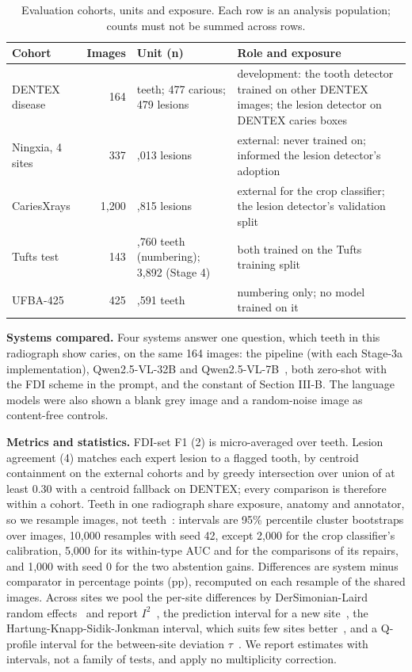 \documentclass[conference]{IEEEtran}
\begin{document}
\begin{table}[t]
\centering
\caption{Evaluation cohorts, units and exposure. Each row is an analysis population; counts must not be summed across rows.}
\label{tab:2}
\footnotesize
\setlength{\tabcolsep}{3pt}
\begin{tabular}{>{\raggedright\arraybackslash}p{2.20cm}r>{\raggedright\arraybackslash}p{4.37cm}>{\raggedright\arraybackslash}p{9.07cm}}
\toprule
Cohort & Images & Unit (n) & Role and exposure \\
\midrule
DENTEX disease & 164 & 936 teeth; 477 carious; 479 lesions & development: the tooth detector trained on other DENTEX images; the lesion detector on DENTEX caries boxes \\
Ningxia, 4 sites & 337 & 1,013 lesions & external: never trained on; informed the lesion detector's adoption \\
CariesXrays & 1,200 & 2,815 lesions & external for the crop classifier; the lesion detector's validation split \\
Tufts test & 143 & 3,760 teeth (numbering); 3,892 (Stage 4) & both trained on the Tufts training split \\
UFBA-425 & 425 & 11,591 teeth & numbering only; no model trained on it \\
\bottomrule
\end{tabular}
\end{table}

\textbf{Systems compared.} Four systems answer one question, which teeth in this radiograph show caries, on the same 164 images: the pipeline (with each Stage-3a implementation), Qwen2.5-VL-32B and Qwen2.5-VL-7B~\cite{bai2025qwen25vl}, both zero-shot with the FDI scheme in the prompt, and the constant of Section III-B. The language models were also shown a blank grey image and a random-noise image as content-free controls.

\textbf{Metrics and statistics.} FDI-set F1 (2) is micro-averaged over teeth. Lesion agreement (4) matches each expert lesion to a flagged tooth, by centroid containment on the external cohorts and by greedy intersection over union of at least 0.30 with a centroid fallback on DENTEX; every comparison is therefore within a cohort. Teeth in one radiograph share exposure, anatomy and annotator, so we resample images, not teeth~\cite{field2007bootstrapping}: intervals are 95\% percentile cluster bootstraps over images, 10,000 resamples with seed 42, except 2,000 for the crop classifier's calibration, 5,000 for its within-type AUC and for the comparisons of its repairs, and 1,000 with seed 0 for the two abstention gains. Differences are system minus comparator in percentage points (pp), recomputed on each resample of the shared images. Across sites we pool the per-site differences by DerSimonian-Laird random effects~\cite{dersimonian1986meta} and report $I^2$~\cite{higgins2002quantifying}, the prediction interval for a new site~\cite{riley2011interpretation}, the Hartung-Knapp-Sidik-Jonkman interval, which suits few sites better~\cite{inthout2014hartung}, and a Q-profile interval for the between-site deviation $\tau$~\cite{viechtbauer2007confidence}. We report estimates with intervals, not a family of tests, and apply no multiplicity correction.
\end{document}
